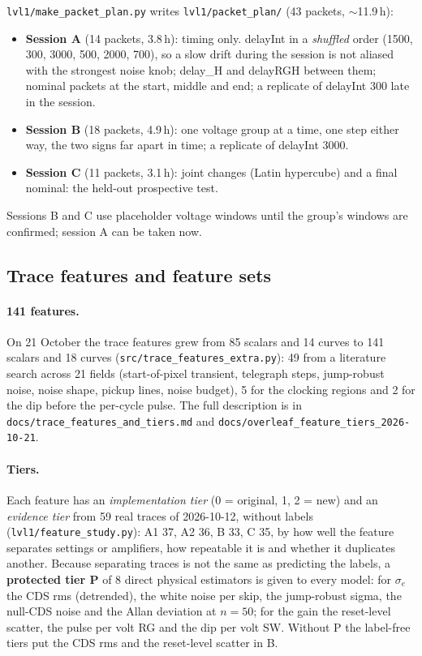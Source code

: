 \documentclass[10pt]{article}
\newcommand{\code}[1]{\texttt{#1}}
\begin{document}
\code{lvl1/make\_packet\_plan.py} writes \code{lvl1/packet\_plan/} (43 packets, $\sim$11.9\,h):
\begin{itemize}
\item \textbf{Session A} (14 packets, 3.8\,h): timing only. delayInt in a \emph{shuffled} order (1500, 300, 3000, 500, 2000, 700), so a slow
  drift during the session is not aliased with the strongest noise knob; delay\_H and delayRGH between them; nominal packets at the
  start, middle and end; a replicate of delayInt 300 late in the session.
\item \textbf{Session B} (18 packets, 4.9\,h): one voltage group at a time, one step either way, the two signs far apart in time; a
  replicate of delayInt 3000.
\item \textbf{Session C} (11 packets, 3.1\,h): joint changes (Latin hypercube) and a final nominal: the held-out prospective test.
\end{itemize}
Sessions B and C use placeholder voltage windows until the group's windows are confirmed; session A can be taken now.

\subsection{Trace features and feature sets}
\label{sec:lvl1feat}

\paragraph{141 features.} On 21 October the trace features grew from 85 scalars and 14 curves to 141 scalars and 18 curves
(\code{src/trace\_features\_extra.py}): 49 from a literature search across 21 fields (start-of-pixel transient, telegraph steps, jump-robust
noise, noise shape, pickup lines, noise budget), 5 for the clocking regions and 2 for the dip before the per-cycle pulse. The full
description is in \code{docs/trace\_features\_and\_tiers.md} and \code{docs/overleaf\_feature\_tiers\_2026-10-21}.

\paragraph{Tiers.} Each feature has an \emph{implementation tier} (0 = original, 1, 2 = new) and an \emph{evidence tier} from 59 real
traces of 2026-10-12, without labels (\code{lvl1/feature\_study.py}): A1 37, A2 36, B 33, C 35, by how well the feature separates
settings or amplifiers, how repeatable it is and whether it duplicates another. Because separating traces is not the same as
predicting the labels, a \textbf{protected tier P} of 8 direct physical estimators is given to every model: for $\sigma_e$ the CDS rms
(detrended), the white noise per skip, the jump-robust sigma, the null-CDS noise and the Allan deviation at $n = 50$; for the gain the
reset-level scatter, the pulse per volt RG and the dip per volt SW. Without P the label-free tiers put the CDS rms and the reset-level
scatter in B.
\end{document}
